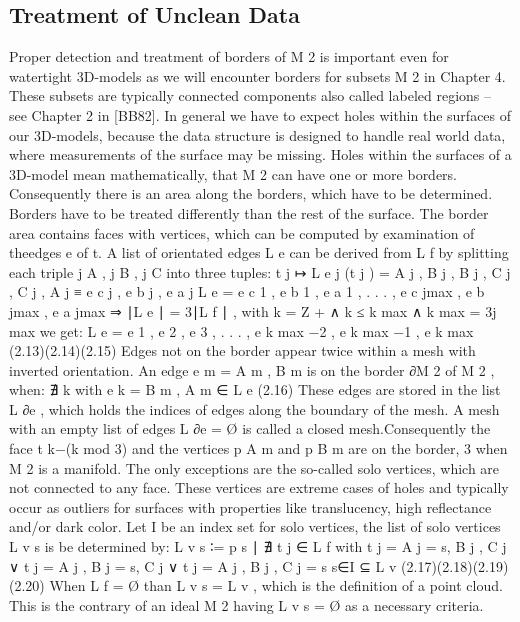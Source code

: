 \documentclass[openany]{book}
\begin{document}
\subsection{Treatment of Unclean Data}
Proper detection and treatment of borders of M 2 is important even for watertight
3D-models as we will encounter borders for subsets M 2 in Chapter 4. These 
subsets are typically connected components also called labeled regions – see 
Chapter 2 in [BB82]. In general we have to expect holes within the surfaces of 
our 3D-models, because the data structure is designed to handle real world data, 
where measurements of the surface may be missing.
Holes within the surfaces of a 3D-model mean mathematically, that M 2 can have 
one or more borders. Consequently there is an area along the borders, which have 
to be determined. Borders have to be treated differently than the rest of the 
surface. The border area contains faces with vertices, which can be computed by 
examination of theedges e of t. A list of orientated edges L e can be derived 
from L f by splitting each triple
{j A , j B , j C } into three tuples:
t j ↦ L e j (t j ) = {{A j , B j }, {B j , C j }, {C j , A j }} ≡ {e c j , 
e b j , e a j }
L e = { e c 1 , e b 1 , e a 1 , . . . , e c jmax , e b jmax , e a jmax }
⇒ ∣L e ∣ = 3∣L f ∣ , with k = Z + ∧ k ≤ k max ∧ k max = 3j max we get:
L e = { e 1 , e 2 , e 3 , . . . , e k max −2 , e k max −1 , e k max }
(2.13)(2.14)(2.15)
Edges not on the border appear twice within a mesh with inverted orientation. 
An edge e m = {A m , B m } is on the border ∂M 2 of M 2 , when: ∄ k with e k = 
{B m , A m } ∈ L e (2.16)
These edges are stored in the list L ∂e , which holds the indices of edges along 
the boundary of the mesh. A mesh with an empty list of edges L ∂e = Ø is called 
a closed mesh.Consequently the face t k−(k mod 3) and the vertices p A m and p B 
m are on the border, 3
when M 2 is a manifold. The only exceptions are the so-called solo vertices, 
which are not connected to any face. These vertices are extreme cases of holes 
and typically occur as outliers for surfaces with properties like translucency, 
high reflectance and/or dark color. Let I be an index set for solo vertices, the 
list of solo vertices L v s is be determined by:
L v s ∶= {p s ∣ ∄ t j ∈ L f with
t j = {A j = s, B j , C j }∨
t j = {A j , B j = s, C j }∨
t j = {A j , B j , C j = s}} s∈I ⊆ L v
(2.17)(2.18)(2.19)(2.20)
When L f = Ø than L v s = L v , which is the definition of a point cloud. This 
is the contrary of an ideal M 2 having L v s = Ø as a necessary 
criteria.~\cite[p.~28]{Mara12}
\end{document}
